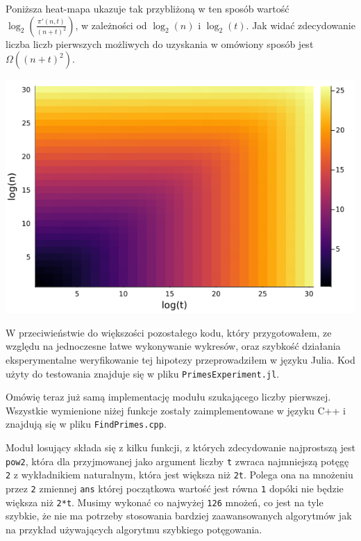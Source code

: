 \documentclass{article}
\begin{document}
Poniższa heat-mapa ukazuje tak przybliżoną w ten sposób wartość $\log_2(\frac{\pi'(n,t)}{(n+t)^2})$, w zależności od $\log_2(n)$ i $\log_2(t)$. 
Jak widać zdecydowanie liczba liczb pierwszych możliwych do uzyskania w omówiony sposób
jest $\Omega((n+t)^2)$.
\begin{center}
    \includegraphics[width=\textwidth]{wykres.png}    
\end{center}


W przeciwieństwie do większości pozostałego kodu, który przygotowałem, ze względu na jednoczesne łatwe wykonywanie wykresów, oraz szybkość działania 
eksperymentalne weryfikowanie
tej hipotezy przeprowadziłem w języku Julia. Kod użyty do testowania znajduje się  w pliku \texttt{PrimesExperiment.jl}.

Omówię teraz już samą implementację modułu szukającego liczby pierwszej. Wszystkie wymienione niżej funkcje zostały  zaimplementowane w języku C++ i znajdują się w pliku \texttt{FindPrimes.cpp}.

Moduł losujący składa się z kilku funkcji, z których zdecydowanie najprostszą jest \texttt{pow2}, która dla przyjmowanej jako argument liczby \texttt{t}
zwraca najmniejszą potęgę \texttt{2} z wykładnikiem naturalnym, która jest większa niż \texttt{2t}. Polega ona na
mnożeniu przez \texttt{2} zmiennej \texttt{ans} której początkowa wartość jest równa \texttt{1} dopóki nie będzie 
większa niż \texttt{2*t}. Musimy wykonać co najwyżej \texttt{126} mnożeń, co jest na tyle szybkie, że nie ma 
potrzeby stosowania bardziej zaawansowanych algorytmów jak na przykład 
używających algorytmu szybkiego potęgowania.
\end{document}
